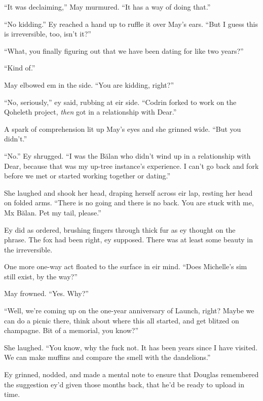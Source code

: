 ``It was declaiming,'' May murmured. ``It has a way of doing that.''

``No kidding.'' Ey reached a hand up to ruffle it over May's ears. ``But I guess this is irreversible, too, isn't it?''

``What, you finally figuring out that we have been dating for like two years?''

``Kind of.''

May elbowed em in the side. ``You are kidding, right?''

``No, seriously,'' ey said, rubbing at eir side. ``Codrin forked to work on the Qoheleth project, \emph{then} got in a relationship with Dear.''

A spark of comprehension lit up May's eyes and she grinned wide. ``But you didn't.''

``No.'' Ey shrugged. ``I was the Bălan who didn't wind up in a relationship with Dear, because that was my up-tree instance's experience. I can't go back and fork before we met or started working together or dating.''

She laughed and shook her head, draping herself across eir lap, resting her head on folded arms. ``There is no going and there is no back. You are stuck with me, Mx Bălan. Pet my tail, please.''

Ey did as ordered, brushing fingers through thick fur as ey thought on the phrase. The fox had been right, ey supposed. There was at least some beauty in the irreversible.

One more one-way act floated to the surface in eir mind. ``Does Michelle's sim still exist, by the way?''

May frowned. ``Yes. Why?''

``Well, we're coming up on the one-year anniversary of Launch, right? Maybe we can do a picnic there, think about where this all started, and get blitzed on champagne. Bit of a memorial, you know?''

She laughed. ``You know, why the fuck not. It has been years since I have visited. We can make muffins and compare the smell with the dandelions.''

Ey grinned, nodded, and made a mental note to ensure that Douglas remembered the suggestion ey'd given those months back, that he'd be ready to upload in time.
